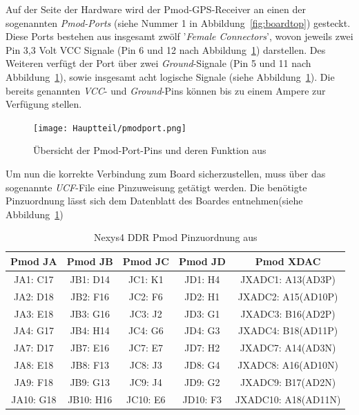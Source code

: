 Auf der Seite der Hardware wird der Pmod-GPS-Receiver an einen der sogenannten \emph{Pmod-Ports}
(siehe Nummer 1 in Abbildung~\ref{fig:boardtop}) gesteckt. Diese Ports bestehen aus insgesamt
zwölf '\emph{Female Connectors}', wovon jeweils zwei Pin 3,3 Volt VCC Signale
(Pin 6 und 12 nach Abbildung~\ref{fig:pmodport}) darstellen. Des Weiteren verfügt der Port über
zwei \emph{Ground}-Signale (Pin 5 und 11 nach Abbildung~\ref{fig:pmodport}), sowie insgesamt acht
logische Signale (siehe Abbildung~\ref{fig:pmodport}). Die bereits genannten \emph{VCC}- und \emph{Ground}-Pins
können bis zu einem Ampere zur Verfügung stellen.\cite{boardman}\\

\begin{figure}[h!]
\centering
\texttt{[image: Hauptteil/pmodport.png]}
\caption{Übersicht der Pmod-Port-Pins und deren Funktion aus \cite{boardman} }
\label{fig:pmodport}
\end{figure}

Um nun die korrekte Verbindung zum Board sicherzustellen, muss über das sogenannte \emph{UCF}-File
eine Pinzuweisung getätigt werden. Die benötigte Pinzuordnung lässt sich dem Datenblatt des Boardes
entnehmen(siehe Abbildung~\ref{tab:pmodporttable})\cite{boardman}\\


\begin{table}[h]
\centering
\begin{tabular}{c|c|c|c|c}
\toprule
\textbf{Pmod JA} & \textbf{Pmod JB} & \textbf{Pmod JC}  & \textbf{Pmod JD} & \textbf{Pmod XDAC}\\
\midrule
\centering
JA1: C17 & JB1: D14 & JC1: K1 & JD1: H4 & JXADC1: A13(AD3P) \\
\hline
JA2: D18 & JB2: F16 & JC2: F6 & JD2: H1 & JXADC2: A15(AD10P) \\
\hline
JA3: E18 & JB3: G16 & JC3: J2 & JD3: G1 & JXADC3: B16(AD2P) \\
\hline
JA4: G17 & JB4: H14 & JC4: G6 & JD4: G3 & JXADC4: B18(AD11P) \\
\hline
JA7: D17 & JB7: E16 & JC7: E7 & JD7: H2 & JXADC7: A14(AD3N) \\
\hline
JA8: E18 & JB8: F13 & JC8: J3 & JD8: G4 & JXADC8: A16(AD10N) \\
\hline
JA9: F18 & JB9: G13 & JC9: J4 & JD9: G2 & JXADC9: B17(AD2N) \\
\hline
JA10: G18 & JB10: H16 & JC10: E6 & JD10: F3 & JXADC10: A18(AD11N) \\
\bottomrule
\end{tabular}
\caption{Nexys4 DDR Pmod Pinzuordnung aus \cite{boardman} }
\label{tab:pmodporttable}
\end{table}

